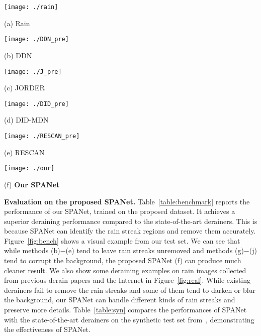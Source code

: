 \documentclass[10pt,twocolumn,letterpaper]{article}
\begin{document}
\begin{figure*}[t]
\centering
\begin{minipage}[t]{0.15\linewidth}
\texttt{[image: ./rain]}
\centerline{\footnotesize (a) Rain}
\end{minipage}
\begin{minipage}[t]{0.15\linewidth}
\texttt{[image: ./DDN\_pre]}
\centerline{\footnotesize (b) DDN~\cite{fu:cvpe:2017:ddn}}
\end{minipage}
\begin{minipage}[t]{0.15\linewidth}
\texttt{[image: ./J\_pre]}
\centerline{\footnotesize (c) JORDER~\cite{yang:cvpr:2017:j}}
\end{minipage}
\begin{minipage}[t]{0.15\linewidth}
\texttt{[image: ./DID\_pre]}
\centerline{\footnotesize (d) DID-MDN~\cite{zhang:cvpr:2018:did}}
\end{minipage}
\begin{minipage}[t]{0.15\linewidth}
\texttt{[image: ./RESCAN\_pre]}
\centerline{\footnotesize (e) RESCAN~\cite{li:eccv:2018:rsecan}}
\end{minipage}
\begin{minipage}[t]{0.15\linewidth}
\texttt{[image: ./our]}
\centerline{\footnotesize (f) \textbf{Our SPANet}}
\end{minipage}
\vspace{0.05in}
\caption{Visual comparison of SPANet with the state-of-the-art CNN-based derainers on some real rain images collected from previous derain papers and from the Internet.}
\label{fig:real}
\end{figure*}



{\bf Evaluation on the proposed SPANet.} Table~\ref{table:benchmark} reports the performance of our SPANet, trained on the proposed dataset. It achieves a superior deraining performance compared to the state-of-the-art derainers. This is because SPANet can identify the rain streak regions and remove them accurately. Figure~\ref{fig:bench} shows a visual example from our test set. We can see that while methods (b)$-$(e) tend to leave rain streaks unremoved and methods (g)$-$(j) tend to corrupt the background, the proposed SPANet (f) can produce much cleaner result. We also show some deraining examples on rain images collected from previous derain papers and the Internet in Figure~\ref{fig:real}. While existing derainers fail to remove the rain streaks and some of them tend to darken or blur the background, our SPANet can handle different kinds of rain streaks and preserve more details. Table~\ref{table:syn} compares the performances of SPANet with the state-of-the-art derainers on the synthetic test set from~\cite{zhang:cvpr:2018:did}, demonstrating the effectiveness of SPANet.
\end{document}
